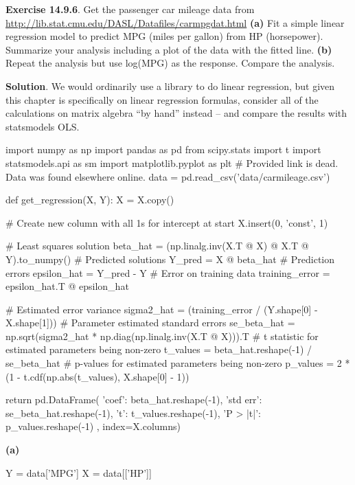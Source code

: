 \textbf{Exercise 14.9.6}. Get the passenger car mileage data from
\url{http://lib.stat.cmu.edu/DASL/Datafiles/carmpgdat.html}
\textbf{(a)} Fit a simple linear regression model to predict MPG (miles
per gallon) from HP (horsepower). Summarize your analysis including a
plot of the data with the fitted line.
\textbf{(b)} Repeat the analysis but use log(MPG) as the response.
Compare the analysis.

\textbf{Solution}.
We would ordinarily use a library to do linear regression, but given
this chapter is specifically on linear regression formulas, consider all
of the calculations on matrix algebra ``by hand'' instead -- and compare
the results with statsmodels OLS.

\begin{python}
import numpy as np
import pandas as pd
from scipy.stats import t
import statsmodels.api as sm
import matplotlib.pyplot as plt
# Provided link is dead.  Data was found elsewhere online.
data = pd.read_csv('data/carmileage.csv')
\end{python}

\begin{python}
def get_regression(X, Y):
    X = X.copy()
    
    # Create new column with all 1s for intercept at start
    X.insert(0, 'const', 1)
    
    # Least squares solution
    beta_hat = (np.linalg.inv(X.T @ X) @ X.T @ Y).to_numpy()
    # Predicted solutions
    Y_pred = X @ beta_hat
    # Prediction errors
    epsilon_hat = Y_pred - Y
    # Error on training data
    training_error = epsilon_hat.T @ epsilon_hat
    
    # Estimated error variance
    sigma2_hat = (training_error / (Y.shape[0] - X.shape[1]))
    # Parameter estimated standard errors
    se_beta_hat = np.sqrt(sigma2_hat * np.diag(np.linalg.inv(X.T @ X))).T
    # t statistic for estimated parameters being non-zero
    t_values = beta_hat.reshape(-1) / se_beta_hat
    # p-values for estimated parameters being non-zero
    p_values = 2 * (1 - t.cdf(np.abs(t_values), X.shape[0] - 1))
    
    return pd.DataFrame({
        'coef': beta_hat.reshape(-1),
        'std err': se_beta_hat.reshape(-1),
        't': t_values.reshape(-1),
        'P > |t|': p_values.reshape(-1) 
        }, index=X.columns)
\end{python}
\textbf{(a)}

\begin{python}
Y = data['MPG']
X = data[['HP']]
\end{python}

